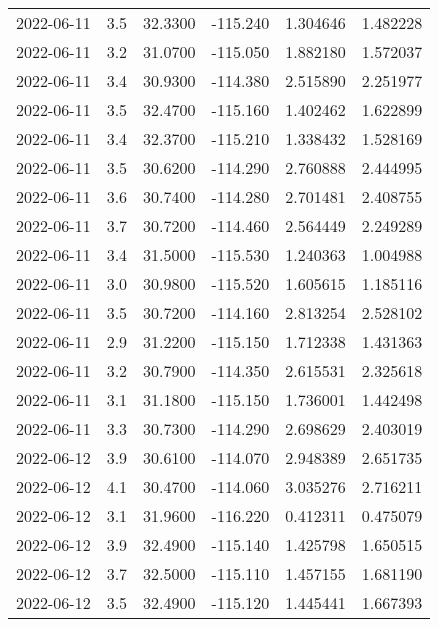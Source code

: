 \begin{tabular}{lrrrrr}
2022-06-11 &       3.5 &  32.3300 &  -115.240 &         1.304646 &         1.482228 \\
2022-06-11 &       3.2 &  31.0700 &  -115.050 &         1.882180 &         1.572037 \\
2022-06-11 &       3.4 &  30.9300 &  -114.380 &         2.515890 &         2.251977 \\
2022-06-11 &       3.5 &  32.4700 &  -115.160 &         1.402462 &         1.622899 \\
2022-06-11 &       3.4 &  32.3700 &  -115.210 &         1.338432 &         1.528169 \\
2022-06-11 &       3.5 &  30.6200 &  -114.290 &         2.760888 &         2.444995 \\
2022-06-11 &       3.6 &  30.7400 &  -114.280 &         2.701481 &         2.408755 \\
2022-06-11 &       3.7 &  30.7200 &  -114.460 &         2.564449 &         2.249289 \\
2022-06-11 &       3.4 &  31.5000 &  -115.530 &         1.240363 &         1.004988 \\
2022-06-11 &       3.0 &  30.9800 &  -115.520 &         1.605615 &         1.185116 \\
2022-06-11 &       3.5 &  30.7200 &  -114.160 &         2.813254 &         2.528102 \\
2022-06-11 &       2.9 &  31.2200 &  -115.150 &         1.712338 &         1.431363 \\
2022-06-11 &       3.2 &  30.7900 &  -114.350 &         2.615531 &         2.325618 \\
2022-06-11 &       3.1 &  31.1800 &  -115.150 &         1.736001 &         1.442498 \\
2022-06-11 &       3.3 &  30.7300 &  -114.290 &         2.698629 &         2.403019 \\
2022-06-12 &       3.9 &  30.6100 &  -114.070 &         2.948389 &         2.651735 \\
2022-06-12 &       4.1 &  30.4700 &  -114.060 &         3.035276 &         2.716211 \\
2022-06-12 &       3.1 &  31.9600 &  -116.220 &         0.412311 &         0.475079 \\
2022-06-12 &       3.9 &  32.4900 &  -115.140 &         1.425798 &         1.650515 \\
2022-06-12 &       3.7 &  32.5000 &  -115.110 &         1.457155 &         1.681190 \\
2022-06-12 &       3.5 &  32.4900 &  -115.120 &         1.445441 &         1.667393 \\

\end{tabular}
